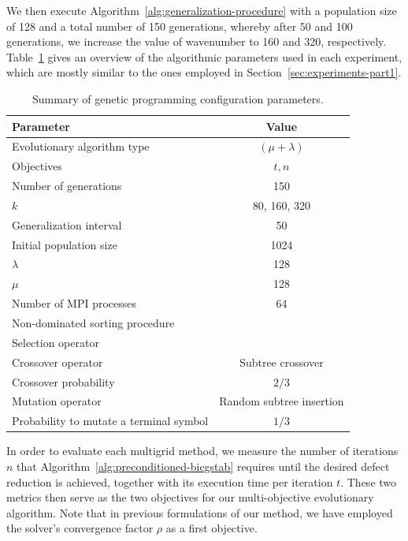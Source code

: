 We then execute Algorithm~\ref{alg:generalization-procedure} with a population size of 128 and a total number of 150 generations, whereby after 50 and 100 generations, we increase the value of wavenumber to 160 and 320, respectively.
Table~\ref{table:gp-parameters-helmholtz} gives an overview of the algorithmic parameters used in each experiment, which are mostly similar to the ones employed in Section~\ref{sec:experiments-part1}.
\begin{table}
	\centering
	\caption{Summary of genetic programming configuration parameters.}
	\label{table:gp-parameters-helmholtz}
	\begin{tabular}{l c}
		\toprule
		Parameter & Value \\
		\midrule 
		Evolutionary algorithm type & $(\mu + \lambda)$ \\
		\midrule
		Objectives & $t, n$ \\
		\midrule
		Number of generations & 150 \\
		\midrule
		$k$ & 80, 160, 320 \\
		\midrule
		Generalization interval & 50 \\
		\midrule
		Initial population size & 1024 \\
		\midrule
		$\lambda$ & 128 \\
		\midrule
		$\mu$ & 128 \\
		\midrule
		Number of MPI processes & 64 \\
		\midrule
		Non-dominated sorting procedure & \cite{deb2002fast} \\ 
		\midrule
		Selection operator & \cite{deb2002fast} \\ 
		\midrule
		Crossover operator & Subtree crossover \\
		\midrule
		Crossover probability & $2/3$ \\
		\midrule
		Mutation operator & Random subtree insertion \\
		\midrule 
		Probability to mutate a terminal symbol & $1/3$ \\
		\bottomrule
	\end{tabular}
\end{table}
In order to evaluate each multigrid method, we measure the number of iterations $n$ that Algorithm~\ref{alg:preconditioned-bicgstab} requires until the desired defect reduction is achieved, together with its execution time per iteration $t$.
These two metrics then serve as the two objectives for our multi-objective evolutionary algorithm.
Note that in previous formulations of our method, we have employed the solver's convergence factor $\rho$ as a first objective.
